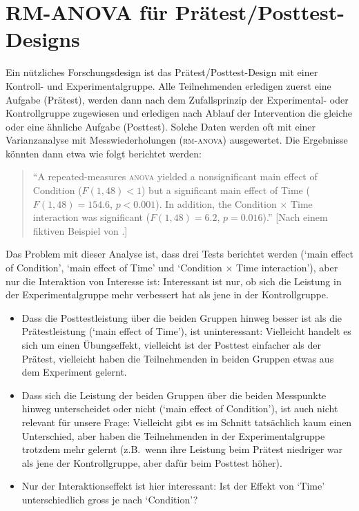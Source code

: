 \documentclass[oneside, 10pt]{book}\usepackage[]{graphicx}\usepackage[]{xcolor}
\begin{document}
\section{RM-ANOVA für Prätest/Posttest-Designs}
Ein nützliches Forschungsdesign ist das Prätest/Posttest-Design
mit einer Kontroll- und Experimentalgruppe. Alle Teilnehmenden
erledigen zuerst eine Aufgabe (Prätest), werden dann nach dem
Zufallsprinzip der Experimental- oder Kontrollgruppe zugewiesen
und erledigen nach Ablauf der Intervention die gleiche oder eine
ähnliche Aufgabe (Posttest). Solche Daten werden oft mit
einer Varianzanalyse mit Messwiederholungen (\textsc{rm-anova})
ausgewertet. Die Ergebnisse könnten dann etwa wie folgt berichtet
werden:
\begin{quote}
``A repeated-measures \textsc{anova} yielded a nonsignificant
main effect of Condition ($F(1, 48) < 1$) but a significant
main effect of Time ($F(1, 48) = 154.6$, $p < 0.001$). In
addition, the Condition $\times$ Time interaction was significant
($F(1, 48) = 6.2$, $p = 0.016$).'' [Nach einem fiktiven Beispiel
von \citealp{Vanhove2015}.]
\end{quote}

Das Problem mit dieser Analyse ist, dass drei Tests berichtet
werden (`main effect of Condition', `main effect of Time' und
`Condition $\times$ Time interaction'), aber nur die Interaktion von
Interesse ist: Interessant ist nur, ob sich die
Leistung in der Experimentalgruppe mehr verbessert hat
als jene in der Kontrollgruppe.
\begin{itemize}
 \item Dass die Posttestleistung über die beiden Gruppen hinweg
 besser ist als die Prätestleistung (`main effect of Time'), 
 ist uninteressant: 
 Vielleicht handelt es sich um einen Übungseffekt, vielleicht
 ist der Posttest einfacher als der Prätest, vielleicht haben
 die Teilnehmenden in beiden Gruppen etwas aus dem Experiment
 gelernt.
 
 \item Dass sich die Leistung der beiden Gruppen über die
 beiden Messpunkte hinweg unterscheidet oder nicht (`main effect
 of Condition'), ist auch nicht relevant für unsere Frage:
 Vielleicht gibt es im Schnitt tatsächlich kaum einen Unterschied,
 aber haben die Teilnehmenden in der Experimentalgruppe trotzdem
 mehr gelernt (z.B.\ wenn ihre Leistung beim Prätest niedriger war
 als jene der Kontrollgruppe, aber dafür beim Posttest höher).
 
 \item Nur der Interaktionseffekt ist hier interessant:
 Ist der Effekt von `Time' unterschiedlich gross je nach `Condition'?
\end{itemize}
\end{document}
